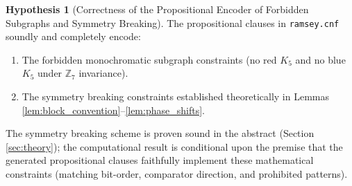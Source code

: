 \documentclass[11pt,a4paper]{article}
\theoremstyle{definition}
\newtheorem{hypothesis}{Hypothesis}
\begin{document}
\begin{hypothesis}[Correctness of the Propositional Encoder of Forbidden Subgraphs and Symmetry Breaking]
The propositional clauses in \texttt{ramsey.cnf} soundly and completely encode:
\begin{enumerate}
    \item The forbidden monochromatic subgraph constraints (no red $K_5$ and no blue $K_5$ under $\mathbb{Z}_7$ invariance).
    \item The symmetry breaking constraints established theoretically in Lemmas \ref{lem:block_convention}--\ref{lem:phase_shifts}.
\end{enumerate}
The symmetry breaking scheme is proven sound in the abstract (Section \ref{sec:theory}); the computational result is conditional upon the premise that the generated propositional clauses faithfully implement these mathematical constraints (matching bit-order, comparator direction, and prohibited patterns).


\end{hypothesis}
\end{document}
